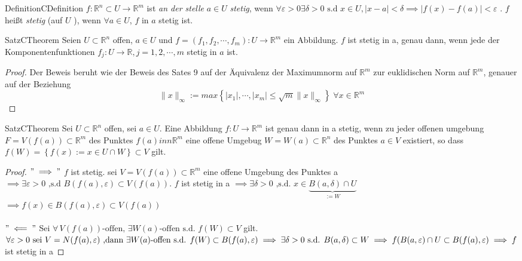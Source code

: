 \documentclass[a4paper]{memoir}
\begin{document}
\begin{ibox}[]{Definition}{CDefinition}
    $ f: \mathbb{R}^n  \subset U \to \mathbb{R}^m $ ist \textit{an der stelle} $ a \in  U $ \textit{stetig}, wenn $ \forall \varepsilon 
	>0 \exists \delta >0 \text{ s.d } x \in  U, \left| x-a \right| < \delta \implies \left| f(x)-f(a) \right| < \varepsilon $ . $ f $ heißt
	\textit{stetig} (auf $ U $ ), wenn $ \forall  a \in U $, $ f \text{ in } a $ stetig ist. 
\end{ibox}

\begin{ibox}[14]{Satz}{CTheorem}
    Seien $ U \subset \mathbb{R}^n  $ offen, $ a \in  U $ und $ f=(f_1,f_2,\cdots, f_m): U \to \mathbb{R}^m  $ ein Abbildung. $ f $ ist 
	stetig in a, genau dann, wenn jede der Komponentenfunktionen $ f_{j} :U \to \mathbb{R} , j = 1,2, \cdots, m $ stetig in $ a $ ist.
\end{ibox}

\begin{proof}
	Der Beweis beruht wie der Beweis des Sates 9 auf der Äquivalenz der Maximumnorm auf $ \mathbb{R}^m $ zur euklidischen Norm auf 
	$ \mathbb{R}^m $, genauer auf der Beziehung
	$$ \|x \|_{\infty}:= max \left\{ \left| x_1 \right| ,\cdots, \left| x_m \right| \leq \sqrt{m} \|x \|_{\infty} \right\} \;  
	\forall  x \in  \mathbb{R}^m$$
	
\end{proof}
\begin{ibox}[15]{Satz}{CTheorem}
    Sei $ U \subset  \mathbb{R}^n  $ offen, sei $ a \in  U $. Eine Abbildung $ f: U \to \mathbb{R}^m $ ist genau dann in a stetig,
	wenn zu jeder offenen umgebung $ F=V(f(a)) \subset \mathbb{R}^m $ des Punktes $ f(a)inn \mathbb{R}^m $ eine offene Umgebug
	$ W = W(a) \subset  \mathbb{R}^n  $ des Punktes $ a \in  V$ existiert, so dass $ f(W) = \left\{ f(x) := x \in U \cap W \right\} 
	\subset  V$ gilt. 
\end{ibox}

\begin{proof}
	$ " \implies " $ $ f $ ist stetig. sei $ V = V(f(a)) \subset  \mathbb{R}^m $ eine offene Umgebung des Punktes a \\ $ \implies \exists 
	\varepsilon  >0 \text{ ,s.d } B(f(a), \varepsilon ) \subset  V(f(a))$. $ f $ ist stetig in a $ \implies \exists \delta > 0 
	\text{ ,s.d. } x \in  \underbrace{B(a, \delta) \cap U}_{:=W} $ \\ $\implies f(x) \in B(f(a), \varepsilon ) \subset  V(f(a))$\\ \\
	$ "\impliedby" $ Sei $ \forall \, V(f(a)) \text{-offen, } \exists W(a) \text{-offen s.d. } f(W) \subset  V $ gilt.
	$ \forall \varepsilon >0 \text{ sei } V = N(f(a), \varepsilon ) \\
	\text{ ,dann } \exists W(a) \text{-offen s.d. } f(W) \subset B(f(a), \varepsilon ) \implies 
	\exists  \delta >0 \text{ s.d. } B(a,\delta) \subset  W \\ 
	\implies  f(B(a, \varepsilon ) \cap U \subset B(f(a), \varepsilon ) \implies 
	f$ ist stetig in a   
\end{proof}
\end{document}
